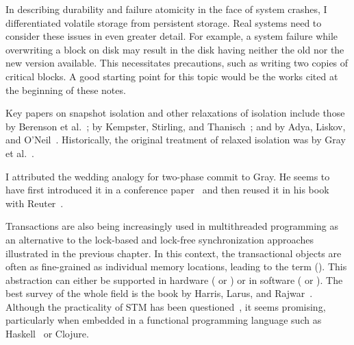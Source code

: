 In describing durability and failure atomicity in the face of system
crashes, I differentiated volatile storage from persistent storage.
Real systems need to consider these issues in even greater detail.
For example, a system failure while overwriting a block on disk may
result in the disk having neither the old nor the new version
available.  This necessitates precautions, such as
writing two copies of critical blocks.  A good starting point
for this topic would be the works cited at the beginning of these
notes.

Key papers on snapshot isolation and other relaxations of isolation
include those by Berenson et
al.~\cite{max1022}; by Kempster,
Stirling, and Thanisch~\cite{max1023}; and by Adya,
Liskov, and
O'Neil~\cite{max1021}. Historically, the
original treatment of relaxed isolation was by Gray
et al.~\cite{max1059}.

I attributed the wedding analogy for two-phase commit to Gray.  He seems to have first introduced it in a conference
paper~\cite{max1051} and then reused it in his book with
Reuter~\cite{max1009}.

Transactions are also being increasingly used in multithreaded
programming as an alternative to the lock-based and lock-free
synchronization approaches illustrated in the previous chapter.  In
this context, the transactional objects are often as fine-grained as
individual memory locations, leading to the term  ().
This abstraction can either be supported in hardware ( or )
or in software ( or ). The best survey of
the whole field is the book by Harris, Larus, and Rajwar~\cite{max1204}.
Although the practicality of STM has been questioned~\cite{max1206,max1207}, it seems promising, particularly when
embedded in a functional programming language such as Haskell~\cite{max1205} or Clojure.
